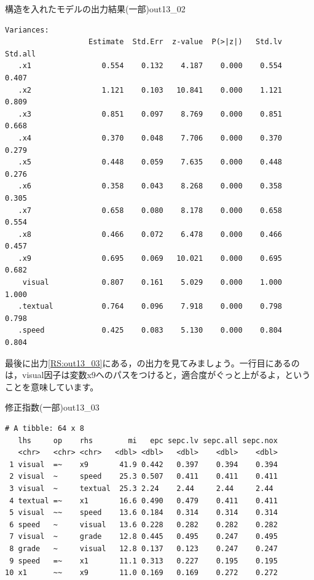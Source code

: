 \documentclass{ltjsbook}
\begin{document}
\begin{Rscreen}{構造を入れたモデルの出力結果(一部)}{out13_02}
\begin{verbatim}
Variances:
                   Estimate  Std.Err  z-value  P(>|z|)   Std.lv  Std.all
   .x1                0.554    0.132    4.187    0.000    0.554    0.407
   .x2                1.121    0.103   10.841    0.000    1.121    0.809
   .x3                0.851    0.097    8.769    0.000    0.851    0.668
   .x4                0.370    0.048    7.706    0.000    0.370    0.279
   .x5                0.448    0.059    7.635    0.000    0.448    0.276
   .x6                0.358    0.043    8.268    0.000    0.358    0.305
   .x7                0.658    0.080    8.178    0.000    0.658    0.554
   .x8                0.466    0.072    6.478    0.000    0.466    0.457
   .x9                0.695    0.069   10.021    0.000    0.695    0.682
    visual            0.807    0.161    5.029    0.000    1.000    1.000
   .textual           0.764    0.096    7.918    0.000    0.798    0.798
   .speed             0.425    0.083    5.130    0.000    0.804    0.804
\end{verbatim}
\end{Rscreen}

最後に出力\ref{RS:out13_03}にある，の出力を見てみましょう。一行目にあるのは，visual因子は変数x9へのパスをつけると，適合度がぐっと上がるよ，ということを意味しています。
\begin{Rscreen}{修正指数(一部)}{out13_03}
    \begin{verbatim}
# A tibble: 64 x 8
   lhs     op    rhs        mi   epc sepc.lv sepc.all sepc.nox
   <chr>   <chr> <chr>   <dbl> <dbl>   <dbl>    <dbl>    <dbl>
 1 visual  =~    x9       41.9 0.442   0.397    0.394    0.394
 2 visual  ~     speed    25.3 0.507   0.411    0.411    0.411
 3 visual  ~     textual  25.3 2.24    2.44     2.44     2.44 
 4 textual =~    x1       16.6 0.490   0.479    0.411    0.411
 5 visual  ~~    speed    13.6 0.184   0.314    0.314    0.314
 6 speed   ~     visual   13.6 0.228   0.282    0.282    0.282
 7 visual  ~     grade    12.8 0.445   0.495    0.247    0.495
 8 grade   ~     visual   12.8 0.137   0.123    0.247    0.247
 9 speed   =~    x1       11.1 0.313   0.227    0.195    0.195
10 x1      ~~    x9       11.0 0.169   0.169    0.272    0.272
\end{verbatim}
\end{Rscreen}
\end{document}
